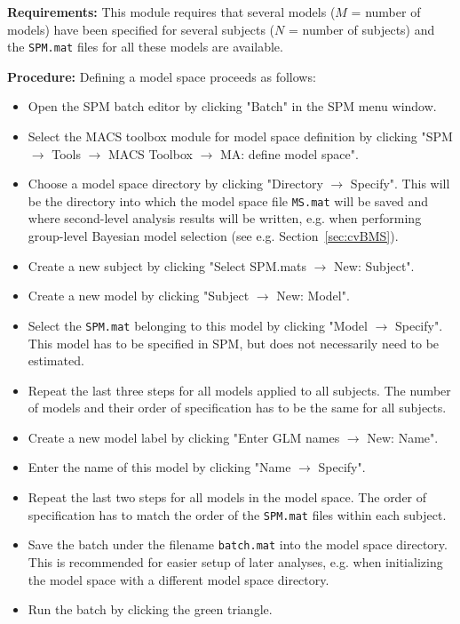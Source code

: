 \documentclass[a4paper,12pt]{article}
\newcommand{\ra}{$\rightarrow$ }
\begin{document}
\textbf{Requirements:} This module requires that several models ($M$ = number of models) have been specified for several subjects ($N$ = number of subjects) and the \texttt{SPM.mat} files for all these models are available.

\textbf{Procedure:} Defining a model space proceeds as follows:
\begin{itemize}

\item
Open the SPM batch editor by clicking "Batch" in the SPM menu window.

\item
Select the MACS toolbox module for model space definition by clicking "SPM \ra Tools \ra MACS Toolbox \ra MA: define model space".

\item
Choose a model space directory by clicking "Directory \ra Specify". This will be the directory into which the model space file \texttt{MS.mat} will be saved and where second-level analysis results will be written, e.g. when performing group-level Bayesian model selection (see e.g. Section~\ref{sec:cvBMS}).

\item
Create a new subject by clicking "Select SPM.mats \ra New: Subject".

\item
Create a new model by clicking "Subject \ra New: Model".

\item
Select the \texttt{SPM.mat} belonging to this model by clicking "Model \ra Specify". This model has to be specified in SPM, but does not necessarily need to be estimated.

\item
Repeat the last three steps for all models applied to all subjects. The number of models and their order of specification has to be the same for all subjects.

\item
Create a new model label by clicking "Enter GLM names \ra New: Name".

\item
Enter the name of this model by clicking "Name \ra Specify".

\item
Repeat the last two steps for all models in the model space. The order of specification has to match the order of the \texttt{SPM.mat} files within each subject.

\pagebreak
\item
Save the batch under the filename \texttt{batch.mat} into the model space directory. This is recommended for easier setup of later analyses, e.g. when initializing the model space with a different model space directory.

\item
Run the batch by clicking the green triangle.

\end{itemize}
\end{document}
